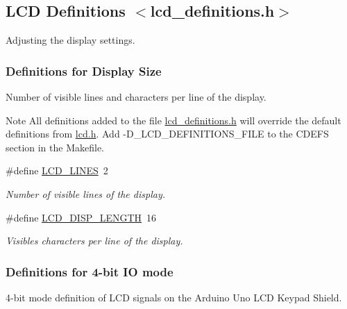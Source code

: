 \hypertarget{a00011}{}\subsection{L\+CD Definitions $<$lcd\+\_\+definitions.\+h$>$}
\label{a00011}


Adjusting the display settings.  


\subsubsection*{Definitions for Display Size}
\label{_amgrpcaec0cb1262819d89ffa7f25526cc869}%
Number of visible lines and characters per line of the display.

\begin{DoxyNote}{Note}
All definitions added to the file \hyperlink{a00004}{lcd\+\_\+definitions.\+h} will override the default definitions from \hyperlink{a00003}{lcd.\+h}. Add -\/\+D\+\_\+\+L\+C\+D\+\_\+\+D\+E\+F\+I\+N\+I\+T\+I\+O\+N\+S\+\_\+\+F\+I\+LE to the C\+D\+E\+FS section in the Makefile. 
\end{DoxyNote}
\begin{DoxyCompactItemize}
\item 
\#define \hyperlink{a00011_ga01212e90283511562039db786f65ba98}{L\+C\+D\+\_\+\+L\+I\+N\+ES}~2\hypertarget{a00011_ga01212e90283511562039db786f65ba98}{}\label{a00011_ga01212e90283511562039db786f65ba98}

\begin{DoxyCompactList}\small\item\em Number of visible lines of the display. \end{DoxyCompactList}\item 
\#define \hyperlink{a00011_ga684bb4392e384b7ae7c660d81dacb930}{L\+C\+D\+\_\+\+D\+I\+S\+P\+\_\+\+L\+E\+N\+G\+TH}~16\hypertarget{a00011_ga684bb4392e384b7ae7c660d81dacb930}{}\label{a00011_ga684bb4392e384b7ae7c660d81dacb930}

\begin{DoxyCompactList}\small\item\em Visibles characters per line of the display. \end{DoxyCompactList}\end{DoxyCompactItemize}
\subsubsection*{Definitions for 4-\/bit IO mode}
\label{_amgrp0d38ed8c5b4202f593f69f9003c1a16c}%
4-\/bit mode definition of L\+CD signals on the Arduino Uno L\+CD Keypad Shield.

